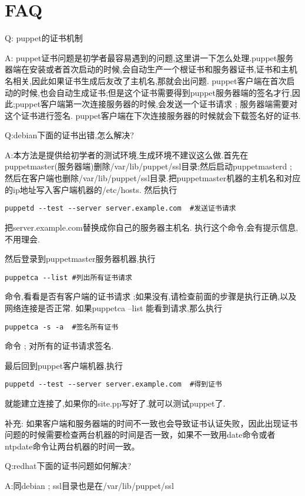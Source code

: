 \chapter{\msyh FAQ}
\par
\msyh Q: puppet的证书机制 \par
A: \song puppet证书问题是初学者最容易遇到的问题,这里讲一下怎么处理.puppet服务器端在安装或者首次启动的时候,会自动生产一个根证书和服务器证书,证书和主机名相关,因此如果证书生成后友改了主机名,那就会出问题.  puppet客户端在首次启动的时候,也会自动生成证书;但是这个证书需要得到puppet服务器端的签名才行,因此;puppet客户端第一次连接服务器的时候,会发送一个证书请求 ; 服务器端需要对这个证书进行签名. puppet客户端在下次连接服务器的时候就会下载签名好的证书.\par
\msyh Q:debian下面的证书出错,怎么解决?\par
A:\song 本方法是提供给初学者的测试环境,生成环境不建议这么做.首先在puppetmaster(服务器端)删除/var/lib/puppet/ssl目录;然后启动puppetmasterd ; 然后在客户端也删除/var/lib/puppet/ssl目录.把puppetmaster机器的主机名和对应的ip地址写入客户端机器的/etc/hosts. 然后执行
\msyh \begin{lstlisting}
puppetd --test --server server.example.com  #发送证书请求
\end{lstlisting} \song
 把server.example.com替换成你自己的服务器主机名. 执行这个命令,会有提示信息,不用理会.\par
然后登录到puppetmaster服务器机器,执行
\msyh \begin{lstlisting}
puppetca --list #列出所有证书请求
\end{lstlisting} \song
命令,看看是否有客户端的证书请求 ;如果没有,请检查前面的步骤是执行正确,以及网络连接是否正常. 如果puppetca --list 能看到请求,那么执行
\msyh \begin{lstlisting}
puppetca -s -a  #签名所有证书
\end{lstlisting} \song
命令 ; 对所有的证书请求签名.  \par
最后回到puppet客户端机器,执行
\msyh \begin{lstlisting}
puppetd --test --server server.example.com  #得到证书
\end{lstlisting} \song
就能建立连接了,如果你的site.pp写好了.就可以测试puppet了.\par
补充: 如果客户端和服务器端的时间不一致也会导致证书认证失败，因此出现证书问题的时候需要检查两台机器的时间是否一致，如果不一致用date命令或者ntpdate命令让两台机器的时间一致。\par

\msyh Q:redhat下面的证书问题如何解决? \par
A:\song 同debian ; ssl目录也是在/var/lib/puppet/ssl \par

